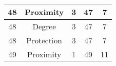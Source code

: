 \documentclass[results.tex]{subfiles}
\begin{document}
\begin{center}
\begin{tabular}{| c || c | c | c | c |}
            \hline
            48                      & Proximity                    & 3                      & 47                      & 7                    \\
            \hline
            48                      & Degree                       & 3                      & 47                      & 7                    \\
            \hline
            48                      & Protection                   & 3                      & 47                      & 7                    \\
            \hline
            49                      & Proximity                    & 1                      & 49                      & 11                   \\
            \hline
        \end{tabular}
    \end{center}
\end{document}
